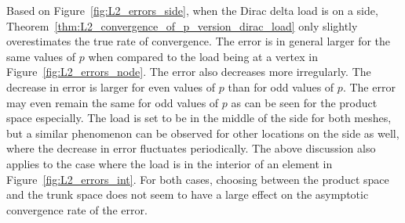 \documentclass[english, 12pt, a4paper, sci, utf8, a-2b, online]{aaltothesis}
\theoremstyle{definition}
\theoremstyle{plain}
\numberwithin{equation}{section}
\begin{document}
Based on Figure~\ref{fig:L2_errors_side}, when the Dirac delta load is on a side,
Theorem~\ref{thm:L2_convergence_of_p_version_dirac_load} only slightly overestimates the
true rate of convergence. The error is in general larger for the same values of $p$
when compared to the load being at a vertex in Figure~\ref{fig:L2_errors_node}.
The error also decreases more irregularly. The decrease in error is larger for even values
of $p$ than for odd values of $p$. The error may even remain the same for
odd values of $p$ as can be seen for the product space especially.
The load is set to be in the middle of the side for both meshes, but
a similar phenomenon can be observed for other locations on the side as well,
where the decrease in error fluctuates periodically.
The above discussion also applies to the case where the load is in the interior of an element
in Figure~\ref{fig:L2_errors_int}.
For both cases, choosing between the product space and the trunk space does not
seem to have a large effect on the asymptotic convergence rate of the error.
\end{document}
